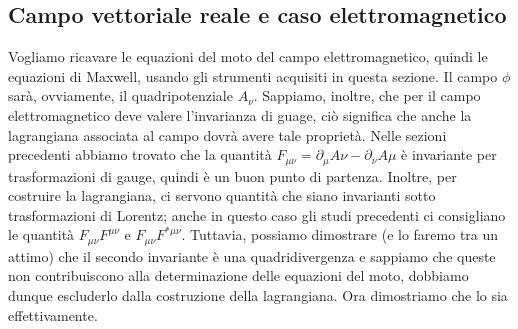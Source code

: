 \subsection{Campo vettoriale reale e caso elettromagnetico}
Vogliamo ricavare le equazioni del moto del campo elettromagnetico, quindi le equazioni di Maxwell, usando gli strumenti acquisiti in questa sezione. Il campo $\phi$ sarà, ovviamente, il quadripotenziale $A_\nu$. Sappiamo, inoltre, che per il campo elettromagnetico deve valere l'invarianza di guage, ciò significa che anche la lagrangiana associata al campo dovrà avere tale proprietà. Nelle sezioni precedenti abbiamo trovato che la quantità $F_{\mu\nu}=\partial_\mu A\nu-\partial_\nu A\mu$ è invariante per trasformazioni di gauge, quindi è un buon punto di partenza. Inoltre, per costruire la lagrangiana, ci servono quantità che siano invarianti sotto trasformazioni di Lorentz; anche in questo caso gli studi precedenti ci consigliano le quantità $F_{\mu\nu}F^{\mu\nu}$ e $F_{\mu\nu}F^{*\mu\nu}$. Tuttavia, possiamo dimostrare (e lo faremo tra un attimo) che  il secondo invariante è una quadridivergenza e sappiamo che queste non contribuiscono alla determinazione delle equazioni del moto, dobbiamo dunque escluderlo dalla costruzione della lagrangiana.
Ora dimostriamo che lo sia effettivamente.
